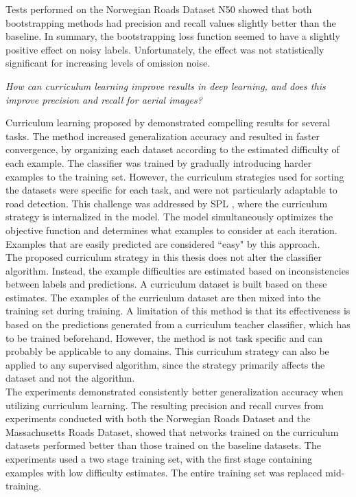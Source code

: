Tests performed on the Norwegian Roads Dataset N50 showed that both bootstrapping methods had precision and recall values slightly better than the baseline. In summary, the bootstrapping loss function seemed to have a slightly positive effect on noisy labels. Unfortunately, the effect was not statistically significant for increasing levels of omission noise. 

\begin{description}[ style=nextline, leftmargin=1.5em, rightmargin=1.5em]
\item[Research question 2:]{\it How can curriculum learning improve results in deep learning, and does this improve precision and recall for aerial images?}
\end{description}

Curriculum learning proposed by \cite{Bengio_curriculumlearning} demonstrated compelling results for several tasks. The method increased generalization accuracy and resulted in faster convergence, by organizing each dataset according to the estimated difficulty of each example. The classifier was trained by gradually introducing harder examples to the training set. However, the curriculum strategies used for sorting the datasets were specific for each task, and were not particularly adaptable to road detection. This challenge was addressed by \ac{SPL} \citep{Kumar_self_paced_learning}, where the curriculum strategy is internalized in the model. The model simultaneously optimizes the objective function and determines what examples to consider at each iteration. Examples that are easily predicted are considered ``easy" by this approach.\\

The proposed curriculum strategy in this thesis does not alter the classifier algorithm. Instead, the example difficulties are estimated based on inconsistencies between labels and predictions. A curriculum dataset is built based on these estimates. The examples of the curriculum dataset are then mixed into the training set during training. A limitation of this method is that its effectiveness is based on the predictions generated from a curriculum teacher classifier, which has to be trained beforehand. However, the method is not task specific and can probably be applicable to any domains. This curriculum strategy can also be applied to any supervised algorithm, since the strategy primarily affects the dataset and not the algorithm. \\

The experiments demonstrated consistently better generalization accuracy when utilizing curriculum learning. The resulting precision and recall curves from experiments conducted with both the Norwegian Roads Dataset and the Massachusetts Roads Dataset, showed that networks trained on the curriculum datasets performed better than those trained on  the baseline datasets. The experiments used a two stage training set, with the first stage containing examples with low difficulty estimates. The entire training set was replaced mid-training. \\

